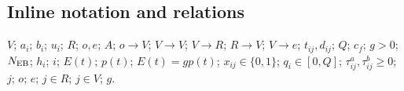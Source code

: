 \documentclass[10pt]{article}
\begin{document}
\subsection*{Inline notation and relations}
$V$; $a_i$; $b_i$; $u_i$; $R$; $o,e$; $A$; $o\to V$; $V\to V$; $V\to R$; $R\to V$; $V\to e$; $t_{ij},d_{ij}$; $Q$; $c_f$; $g>0$; $N_{\rm EB}$; $h_i$; $i$; $E(t)$; $p(t)$; $E(t)=g p(t)$; $x_{ij}\in\{0,1\}$; $q_i\in[0,Q]$; $\tau^a_{ij},\tau^b_{ij}\ge0$; $j$; $o$; $e$; $j\in R$; $j\in V$; $g$.
\end{document}
